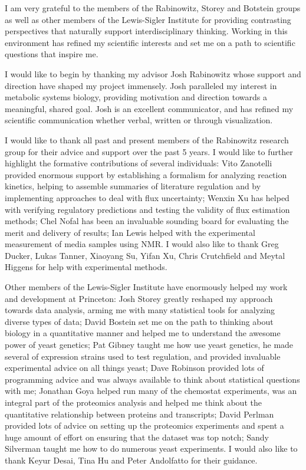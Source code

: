 I am very grateful to the members of the Rabinowitz, Storey and Botstein groups as well as other members of the Lewis-Sigler Institute for providing contrasting perspectives that naturally support interdisciplinary thinking. Working in this environment has refined my scientific interests and set me on a path to scientific questions that inspire me.

I would like to begin by thanking my advisor Josh Rabinowitz whose support and direction have shaped my project immensely. Josh paralleled my interest in metabolic systems biology, providing motivation and direction towards a meaningful, shared goal. Josh is an excellent communicator, and has refined my scientific communication whether verbal, written or through visualization.

I would like to thank all past and present members of the Rabinowitz research group for their advice and support over the past 5 years. I would like to further highlight the formative contributions of several individuals: Vito Zanotelli provided enormous support by establishing a formalism for analyzing reaction kinetics, helping to assemble summaries of literature regulation and by implementing approaches to deal with flux uncertainty; Wenxin Xu has helped with verifying regulatory predictions and testing the validity of flux estimation methods; Chel Nofal has been an invaluable sounding board for evaluating the merit and delivery of results; Ian Lewis helped with the experimental measurement of media samples using NMR. I would also like to thank Greg Ducker, Lukas Tanner, Xiaoyang Su, Yifan Xu, Chris Crutchfield and Meytal Higgens for help with experimental methods.

Other members of the Lewis-Sigler Institute have enormously helped my work and development at Princeton: Josh Storey greatly reshaped my approach towards data analysis, arming me with many statistical tools for analyzing diverse types of data; David Bostein set me on the path to thinking about biology in a quantitative manner and helped me to understand the awesome power of yeast genetics; Pat Gibney taught me how use yeast genetics, he made several of expression strains used to test regulation, and provided invaluable experimental advice on all things yeast; Dave Robinson provided lots of programming advice and was always available to think about statistical questions with me; Jonathan Goya helped run many of the chemostat experiments, was an integral part of the proteomics analysis and helped me think about the quantitative relationship between proteins and transcripts; David Perlman provided lots of advice on setting up the proteomics experiments and spent a huge amount of effort on ensuring that the dataset was top notch; Sandy Silverman taught me how to do numerous yeast experiments. I would also like to thank Keyur Desai, Tina Hu and Peter Andolfatto for their guidance.


